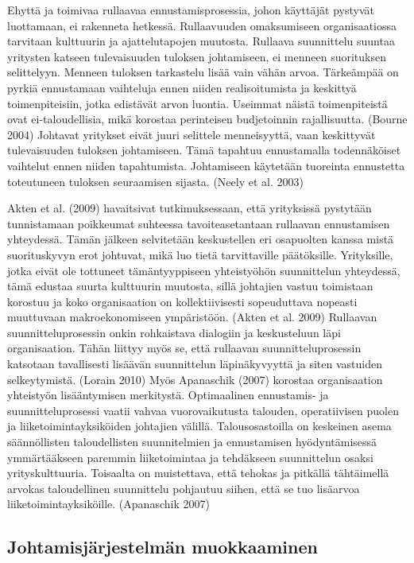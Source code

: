 \documentclass[12pt,a4paper,oneside,pdftex]{report}
\begin{document}
Ehyttä ja toimivaa rullaavaa ennustamisprosessia, johon käyttäjät pystyvät luottamaan, ei rakenneta hetkessä. Rullaavuuden omaksumiseen organisaatiossa tarvitaan kulttuurin ja ajattelutapojen muutosta. Rullaava suunnittelu suuntaa yritysten katseen tulevaisuuden tuloksen johtamiseen, ei menneen suorituksen selittelyyn. Menneen tuloksen tarkastelu lisää vain vähän arvoa. Tärkeämpää on pyrkiä ennustamaan vaihteluja ennen niiden realisoitumista ja keskittyä toimenpiteisiin, jotka edistävät arvon luontia. Useimmat näistä toimenpiteistä ovat ei-taloudellisia, mikä korostaa perinteisen budjetoinnin rajallisuutta. (Bourne 2004) Johtavat yritykset eivät juuri selittele menneisyyttä, vaan keskittyvät tulevaisuuden tuloksen johtamiseen. Tämä tapahtuu ennustamalla todennäköiset vaihtelut ennen niiden tapahtumista. Johtamiseen käytetään tuoreinta ennustetta toteutuneen tuloksen seuraamisen sijasta. (Neely et al. 2003)

Akten et al. (2009) havaitsivat tutkimuksessaan, että yrityksissä pystytään tunnistamaan poikkeumat suhteessa tavoiteasetantaan rullaavan ennustamisen yhteydessä. Tämän jälkeen selvitetään keskustellen eri osapuolten kanssa mistä suorituskyvyn erot johtuvat, mikä luo tietä tarvittaville päätöksille. Yrityksille, jotka eivät ole tottuneet tämäntyyppiseen yhteistyöhön suunnittelun yhteydessä, tämä edustaa suurta kulttuurin muutosta, sillä johtajien vastuu toimistaan korostuu ja koko organisaation on kollektiivisesti sopeuduttava nopeasti muuttuvaan makroekonomiseen ympäristöön. (Akten et al. 2009) Rullaavan suunnitteluprosessin onkin rohkaistava dialogiin ja keskusteluun läpi organisaation. Tähän liittyy myös se, että rullaavan suunnitteluprosessin katsotaan tavallisesti lisäävän suunnittelun läpinäkyvyyttä ja siten vastuiden selkeytymistä. (Lorain 2010) Myös Apanaschik (2007) korostaa organisaation yhteistyön lisääntymisen merkitystä. Optimaalinen ennustamis- ja suunnitteluprosessi vaatii vahvaa vuorovaikutusta talouden, operatiivisen puolen ja liiketoimintayksiköiden johtajien välillä. Talousosastoilla on keskeinen asema säännöllisten taloudellisten suunnitelmien ja ennustamisen hyödyntämisessä ymmärtääkseen paremmin liiketoimintaa ja tehdäkseen suunnittelun osaksi yrityskulttuuria. Toisaalta on muistettava, että tehokas ja pitkällä tähtäimellä arvokas taloudellinen suunnittelu pohjautuu siihen, että se tuo lisäarvoa liiketoimintayksiköille. (Apanaschik 2007)

\subsection{Johtamisjärjestelmän muokkaaminen}
\end{document}
